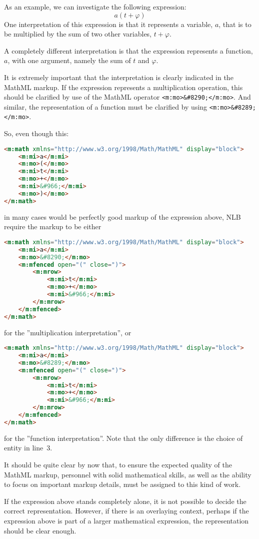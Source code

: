 \documentclass[english,a4paper,11pt]{article}
\begin{document}
As an example, we can investigate the following expression:
\begin{equation}
a (t + \varphi)
\end{equation}
One interpretation of this expression is that it represents a variable, $a$, that is to be multiplied by the sum of two other variables, $t + \varphi$.
 
A completely different interpretation is that the expression represents a function, $a$, with one argument, namely the sum of $t$ and $\varphi$.

It is extremely important that the interpretation is clearly indicated in the MathML markup. If the expression represents a multiplication operation, this should be clarified by use of the MathML operator
\verb|<m:mo>&#8290;</m:mo>|. And similar, the representation of a function must be clarified by using
\verb|<m:mo>&#8289;</m:mo>|.


So, even though this:
\begin{lstlisting}[language=HTML]
<m:math xmlns="http://www.w3.org/1998/Math/MathML" display="block">
	<m:mi>a</m:mi>
	<m:mo>(</m:mo>
	<m:mi>t</m:mi>
	<m:mo>+</m:mo>
	<m:mi>&#966;</m:mi>
	<m:mo>)</m:mo>
</m:math>
\end{lstlisting}
in many cases would be perfectly good markup of the expression above, NLB require the markup to be either
\begin{lstlisting}[language=HTML]
<m:math xmlns="http://www.w3.org/1998/Math/MathML" display="block">
	<m:mi>a</m:mi>
	<m:mo>&#8290;</m:mo>
	<m:mfenced open="(" close=")">
		<m:mrow>
			<m:mi>t</m:mi>
			<m:mo>+</m:mo>
			<m:mi>&#966;</m:mi>
		</m:mrow>
	</m:mfenced>
</m:math>
\end{lstlisting}
for the ''multiplication interpretation'', or
\begin{lstlisting}[language=HTML]
<m:math xmlns="http://www.w3.org/1998/Math/MathML" display="block">
	<m:mi>a</m:mi>
	<m:mo>&#8289;</m:mo>
	<m:mfenced open="(" close=")">
		<m:mrow>
			<m:mi>t</m:mi>
			<m:mo>+</m:mo>
			<m:mi>&#966;</m:mi>
		</m:mrow>
	</m:mfenced>
</m:math>
\end{lstlisting}
for the ''function interpretation''. Note that the only difference is the choice of entity in line~3.

It should be quite clear by now that, to ensure the expected quality of the MathML markup, personnel with solid mathematical skills, as well as the ability to focus on important markup details, must be assigned to this kind of work.


If the expression above stands completely alone, it is not possible to decide the correct representation. However, if there is an overlaying context, perhaps if the expression above is part of a larger mathematical expression, the representation should be clear enough.
\end{document}

